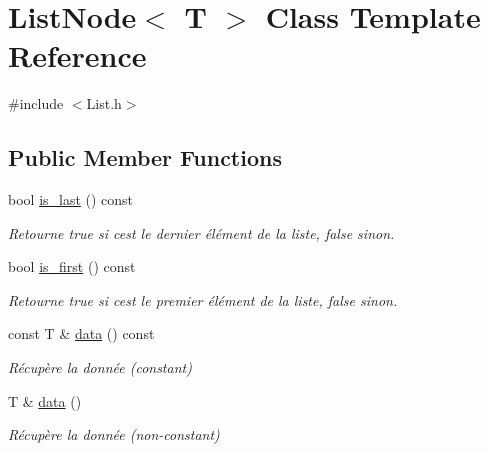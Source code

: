 \hypertarget{classListNode}{}\section{List\+Node$<$ T $>$ Class Template Reference}
\label{classListNode}


{\ttfamily \#include $<$List.\+h$>$}

\subsection*{Public Member Functions}
\begin{DoxyCompactItemize}
\item 
\mbox{\label{classListNode_acba79f1c160a1dfcded3abdba3f6ffac}} 
bool \hyperlink{classListNode_acba79f1c160a1dfcded3abdba3f6ffac}{is\+\_\+last} () const
\begin{DoxyCompactList}\small\item\em Retourne true si c\textquotesingle{}est le dernier élément de la liste, false sinon. \end{DoxyCompactList}\item 
\mbox{\label{classListNode_a6f0a7cc34d7a373588038ad0ccda4b46}} 
bool \hyperlink{classListNode_a6f0a7cc34d7a373588038ad0ccda4b46}{is\+\_\+first} () const
\begin{DoxyCompactList}\small\item\em Retourne true si c\textquotesingle{}est le premier élément de la liste, false sinon. \end{DoxyCompactList}\item 
\mbox{\label{classListNode_ae9bdbf7357e574450501020e0202e478}} 
const T \& \hyperlink{classListNode_ae9bdbf7357e574450501020e0202e478}{data} () const
\begin{DoxyCompactList}\small\item\em Récupère la donnée (constant) \end{DoxyCompactList}\item 
\mbox{\label{classListNode_af556127c386016cd5af6a1d687765050}} 
T \& \hyperlink{classListNode_af556127c386016cd5af6a1d687765050}{data} ()
\begin{DoxyCompactList}\small\item\em Récupère la donnée (non-\/constant) \end{DoxyCompactList}\item 

\end{DoxyCompactItemize}
